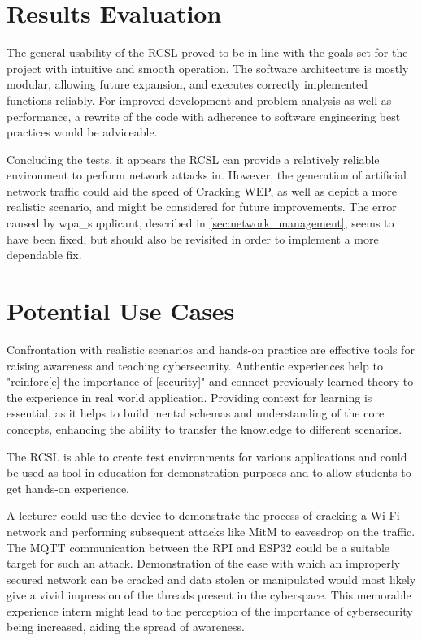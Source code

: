 \section{Results Evaluation}
The general usability of the RCSL proved to be in line with the goals set for the project with intuitive and smooth operation.
The software architecture is mostly modular, allowing future expansion, and executes correctly implemented functions reliably.
For improved development and problem analysis as well as performance, a rewrite of the code with adherence to software engineering best practices would be adviceable.

Concluding the tests, it appears the RCSL can provide a relatively reliable environment to perform network attacks in.
However, the generation of artificial network traffic could aid the speed of Cracking WEP, as well as depict a more realistic scenario, and might be considered for future improvements.
The error caused by wpa\_supplicant, described in \cref{sec:network_management}, seems to have been fixed, but should also be revisited in order to implement a more dependable fix.


\section{Potential Use Cases}
Confrontation with realistic scenarios and hands-on practice are effective tools for raising awareness and teaching cybersecurity.
Authentic experiences help to "reinforc[e] the importance of [security]" \cite{mariano2024wifi} and connect previously learned theory to the experience in real world application. 
Providing context for learning is essential, as it helps to build mental schemas and understanding of the core concepts, enhancing the ability to transfer the knowledge to different scenarios. \cite[page~61]{Cybersec_Edu}

The RCSL is able to create test environments for various applications and could be used as tool in education for demonstration purposes and to allow students to get hands-on experience.

A lecturer could use the device to demonstrate the process of cracking a Wi-Fi network and performing subsequent attacks like MitM to eavesdrop on the traffic.
The MQTT communication between the RPI and ESP32 could be a suitable target for such an attack.
Demonstration of the ease with which an improperly secured network can be cracked and data stolen or manipulated would most likely give a vivid impression of the threads present in the cyberspace.
This memorable experience intern might lead to the perception of the importance of cybersecurity being increased, aiding the spread of awareness.

